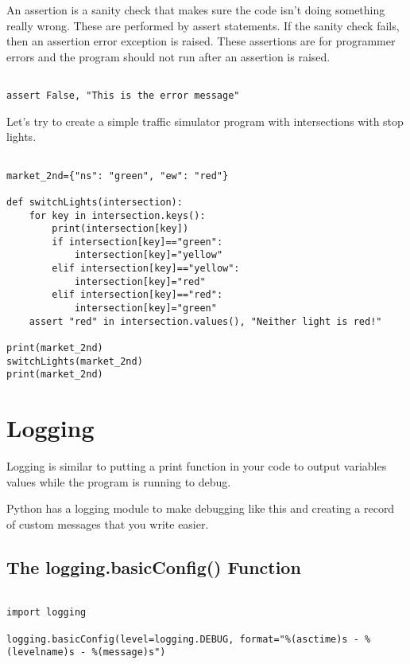 \documentclass[11pt]{article}
\begin{document}
An assertion is a sanity check that makes sure the code isn't doing something really wrong. These are performed by assert statements. If the sanity check fails, then an assertion error exception is raised. These assertions are for programmer errors and the program should not run after an assertion is raised.

\begin{verbatim}

assert False, "This is the error message"

\end{verbatim}

Let's try to create a simple traffic simulator program with intersections with stop lights.

\begin{verbatim}

market_2nd={"ns": "green", "ew": "red"}

def switchLights(intersection):
    for key in intersection.keys():
        print(intersection[key])
        if intersection[key]=="green":
            intersection[key]="yellow"
        elif intersection[key]=="yellow":
            intersection[key]="red"
        elif intersection[key]=="red":
            intersection[key]="green"
    assert "red" in intersection.values(), "Neither light is red!"

print(market_2nd)
switchLights(market_2nd)
print(market_2nd)

\end{verbatim}

\section{Logging}
\label{sec:orgb47db0e}

Logging is similar to putting a print function in your code to output variables values while the program is running to debug.

Python has a logging module to make debugging like this and creating a record of custom messages that you write easier.

\subsection{The logging.basicConfig() Function}
\label{sec:orgd104dfe}

\begin{verbatim}

import logging

logging.basicConfig(level=logging.DEBUG, format="%(asctime)s - %(levelname)s - %(message)s")

\end{verbatim}
\end{document}
